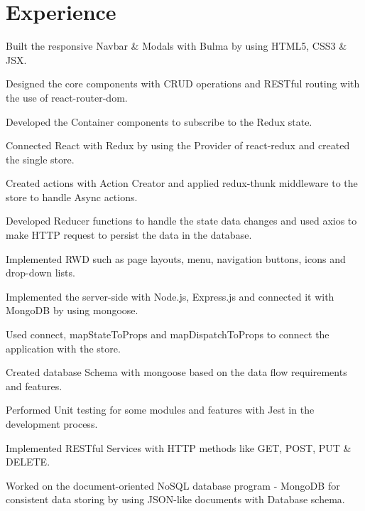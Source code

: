 \documentclass[letterpaper]{deedy-resume} %
\begin{document}
\hfill
%
%
\begin{minipage}[t]{0.66\textwidth} %

\section{Experience}

\vspace{\topsep} %
\vspace{\topsep}
\begin{tightitemize}
	\item Built the responsive Navbar \& Modals with Bulma by using HTML5, CSS3 \& JSX.
	\item Designed the core components with CRUD operations and RESTful routing with the use of react-router-dom.
	\item Developed the Container components to subscribe to the Redux state.
	\item Connected React with Redux by using the Provider of react-redux and created the single store.
	\item Created actions with Action Creator and applied redux-thunk middleware to the store to handle Async actions.
	\item Developed Reducer functions to handle the state data changes and used axios to make HTTP request to persist the data in the database.
	\item Implemented RWD such as page layouts, menu, navigation buttons, icons and drop-down lists.
	\item Implemented the server-side with Node.js, Express.js and connected it with MongoDB by using mongoose.
	\item Used connect, mapStateToProps and mapDispatchToProps to connect the application with the store.
	\item Created database Schema with mongoose based on the data flow requirements and features.
	\item Performed Unit testing for some modules and features with Jest in the development process.
	\item Implemented RESTful Services with HTTP methods like GET, POST, PUT \& DELETE.
	\item Worked on the document-oriented NoSQL database program - MongoDB for consistent data storing by using JSON-like documents with Database schema.
	

\end{tightitemize}
\end{minipage}
\end{document}

